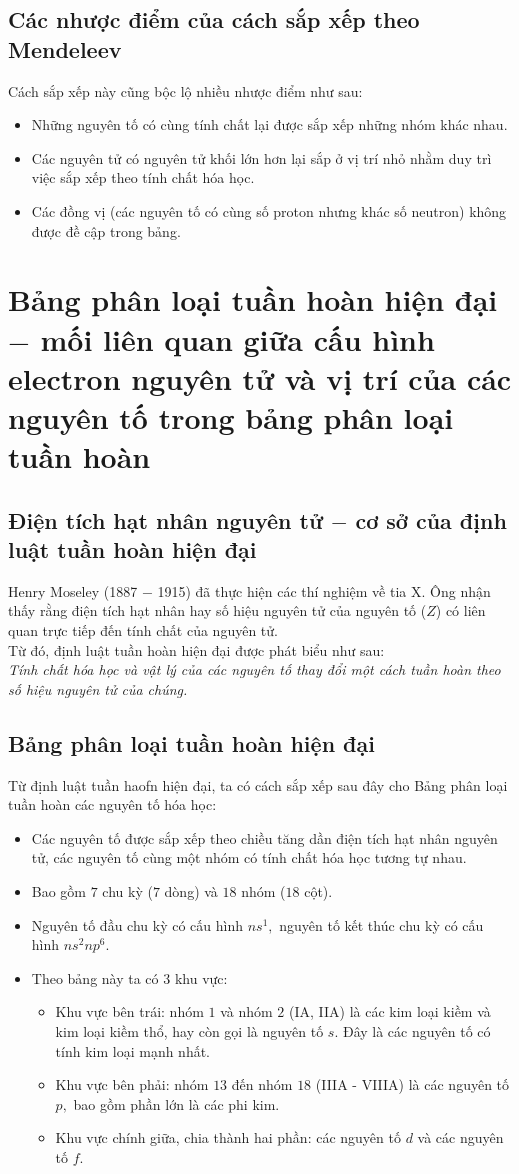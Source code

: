 \subsection{Các nhược điểm của cách sắp xếp theo Mendeleev}
Cách sắp xếp này cũng bộc lộ nhiều nhược điểm như sau:
\begin{itemize}
\item Những nguyên tố có cùng tính chất lại được sắp xếp những nhóm khác nhau.
\item Các nguyên tử có nguyên tử khối lớn hơn lại sắp ở vị trí nhỏ nhằm duy trì việc sắp xếp theo tính chất hóa học.
\item Các đồng vị (các nguyên tố có cùng số proton nhưng khác số neutron) không được đề cập trong bảng.
\end{itemize}
\section{Bảng phân loại tuần hoàn hiện đại $-$ mối liên quan giữa cấu hình electron nguyên tử và vị trí của các nguyên tố trong bảng phân loại tuần hoàn}
\subsection{Điện tích hạt nhân nguyên tử $-$ cơ sở của định luật tuần hoàn hiện đại}
Henry Moseley (1887 $-$ 1915) đã thực hiện các thí nghiệm về tia X. Ông nhận thấy rằng điện tích hạt nhân hay số hiệu nguyên tử của nguyên tố ($Z$) có liên quan trực tiếp đến tính chất của nguyên tử.\\
Từ đó, định luật tuần hoàn hiện đại được phát biểu như sau:\\
\textit{Tính chất hóa học và vật lý của các nguyên tố thay đổi một cách tuần hoàn theo số hiệu nguyên tử của chúng.}
\subsection{Bảng phân loại tuần hoàn hiện đại}
Từ định luật tuần haofn hiện đại, ta có cách sắp xếp sau đây cho Bảng phân loại tuần hoàn các nguyên tố hóa học:
\begin{itemize}
\item Các nguyên tố được sắp xếp theo chiều tăng dần điện tích hạt nhân nguyên tử, các nguyên tố cùng một nhóm có tính chất hóa học tương tự nhau.
\item Bao gồm $7$ chu kỳ ($7$ dòng) và $18$ nhóm ($18$ cột).
\item Nguyên tố đầu chu kỳ có cấu hình $ns^1,$ nguyên tố kết thúc chu kỳ có cấu hình $ns^2 np^6.$
\item Theo bảng này ta có $3$ khu vực:
\begin{itemize}
\item Khu vực bên trái: nhóm $1$ và nhóm $2$ (IA, IIA) là các kim loại kiềm và kim loại kiềm thổ, hay còn gọi là nguyên tố $s.$ Đây là các nguyên tố có tính kim loại mạnh nhất.
\item Khu vực bên phải: nhóm $13$ đến nhóm $18$ (IIIA - VIIIA) là các nguyên tố $p,$ bao gồm phần lớn là các phi kim.
\item Khu vực chính giữa, chia thành hai phần: các nguyên tố $d$ và các nguyên tố $f.$
\end{itemize}
\end{itemize}

